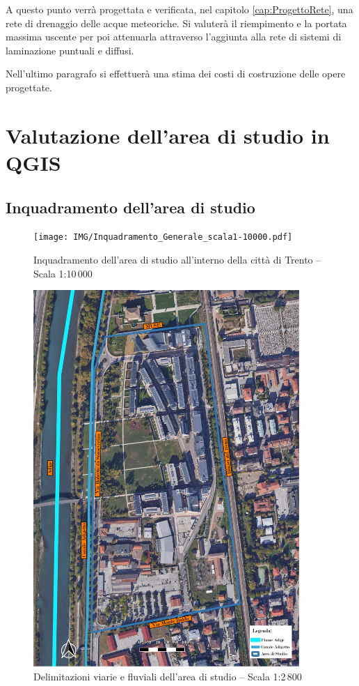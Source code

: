 A questo punto verrà progettata e verificata, nel capitolo \ref{cap:ProgettoRete}, una rete di drenaggio delle acque meteoriche. Si valuterà il riempimento e la portata massima uscente per poi attenuarla attraverso l'aggiunta alla rete di sistemi di laminazione puntuali e diffusi.

Nell'ultimo paragrafo si effettuerà una stima dei costi di costruzione delle opere progettate.


\section{Valutazione dell’area di studio in QGIS}
\subsection{Inquadramento dell'area di studio}
\begin{figure}[p]
    \centering
    \texttt{[image: IMG/Inquadramento\_Generale\_scala1-10000.pdf]} 
    \caption{Inquadramento dell'area di studio all'interno della città di Trento -- Scala 1:10\,000}
    \label{fig:inquadramentoGenerale}
\end{figure}
\begin{figure}[p]
    \centering
    \includegraphics[trim=0cm 0cm 0cm 0cm,clip,frame,width=0.9\textwidth]{IMG/Inquadramento_scala1-2800.pdf} 
    \caption{Delimitazioni viarie e fluviali dell'area di studio -- Scala 1:2\,800}
    \label{fig:inquadramentoDettaglio}
\end{figure}

